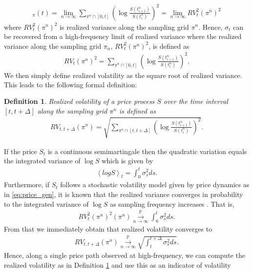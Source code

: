 \documentclass{article}
\newtheorem{definition}{Definition}
\begin{document}
\begin{align*}
[\log S]_\pi (t) = \lim_{n\rightarrow \infty} \sum_{\pi^n \cap [0,t]} \left( \log \frac{S(t^n_{i+1})}{S(t^n_i)}\right)^2 = \lim_{n\rightarrow \infty} RV_t^2(\pi^n)^2
\end{align*}
where $RV_t^2(\pi^n)^2$ is realized variance along the sampling grid $\pi^n$. Hence, $\sigma_t$ can be recovered from a high-frequency limit of realized variance where the realized variance along the sampling grid $\pi_n$, $RV_t^2(\pi^n)^2$, is defined as
\begin{align}
RV_t(\pi^n)^2 = \sum_{\pi^n \cap [0,t]}\left(\log \frac{S(t^n_{i+1})}{S(t^n_i)}\right)^2. \label{eq:real_var_orig}
\end{align} 
We then simply define realized volatility as the square root of realized variance. This leads to the following formal definition: 
\begin{definition}
Realized volatility of a price process $S$ over the time interval $[t,t+\Delta]$ along the sampling grid $\pi^n$ is defined as 
\begin{align*}
RV_{t,t+\Delta}(\pi^n) = \sqrt{\sum_{\pi^n \cap [t,t+\Delta]}\left(\log \frac{S(t^n_{i+1})}{S(t^n_i)}\right)^2}. 
\end{align*}
\label{def:real_vol}
\end{definition}
If the price $S_t$ is a continuous semimartingale then the quadratic variation equals the integrated variance of $\log S$ which is given by
\begin{align}
\left\langle log S \right\rangle_t = \int_0^t \sigma_s^2 ds. \label{eq:int_var}
\end{align}
Furthermore, if $S_t$ follows a stochastic volatility model given by price dynamics as in \eqref{eq:price_gen}, it is known that the realized variance converges in probability to the integrated variance of $\log S$ as sampling frequency increases \cite{jacod2012}. That is,
\begin{align*}
RV_t^2(\pi^n)^2 (\pi^n) \overset{\mathbb{P}}{\underset{n \to \infty}{\longrightarrow}} \int_0^t \sigma_s^2 ds.
\end{align*} 
From that we immediately obtain that realized volatility converges to
\begin{align*}
 RV_{t,t+\Delta} (\pi^n) \overset{\mathbb{P}}{\underset{n \to \infty}{\longrightarrow}} \sqrt{\int^{t+\Delta}_t\sigma^2_s ds}.
\end{align*}
Hence, along a single price path observed at high-frequency, we can compute the realized volatility as in Definition \ref{def:real_vol} and use this as an indicator of volatility
\end{document}
